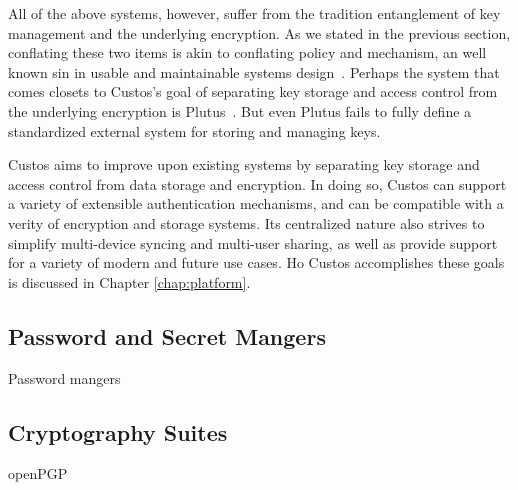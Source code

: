All of the above systems, however, suffer from the tradition
entanglement of key management and the underlying encryption. As we
stated in the previous section, conflating these two items is akin to
conflating policy and mechanism, an well known sin in usable and
maintainable systems design~\cite{Wulf1974}. Perhaps the system that
comes closets to Custos's goal of separating key storage and access
control from the underlying encryption is
Plutus~\cite{Kallahalla2003}. But even Plutus fails to fully define a
standardized external system for storing and managing keys.

Custos aims to improve upon existing systems by separating key storage
and access control from data storage and encryption. In doing so,
Custos can support a variety of extensible authentication mechanisms,
and can be compatible with a verity of encryption and storage
systems. Its centralized nature also strives to simplify multi-device
syncing and multi-user sharing, as well as provide support for a
variety of modern and future use cases. Ho Custos accomplishes these
goals is discussed in Chapter \ref{chap:platform}.

\subsection{Password and Secret Mangers}

Password mangers

\subsection{Cryptography Suites}

openPGP
